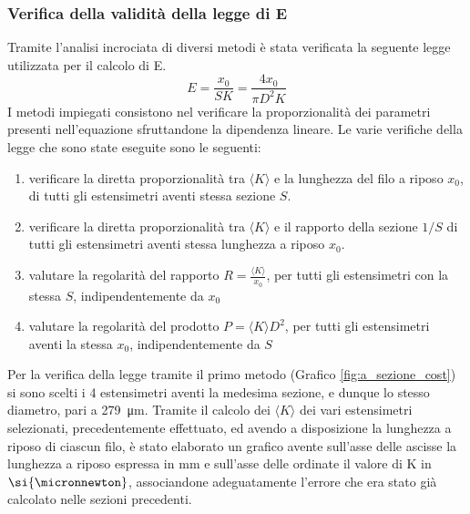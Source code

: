 \documentclass[a4paper,11pt,oneside]{article}
\begin{document}
\subsubsection*{Verifica della validità della legge di E}
Tramite l'analisi incrociata di diversi metodi è stata verificata la seguente legge utilizzata per il calcolo di E.
\begin{equation}
    \label{equation:legge_e}
    E=\frac{x_0}{S K}=\frac{4 x_0}{\pi D^{2}K}
\end{equation}
I metodi impiegati consistono nel verificare la proporzionalità dei parametri presenti nell'equazione sfruttandone la dipendenza lineare. Le varie verifiche della legge che sono state eseguite sono le seguenti:
\begin{enumerate}
    \item verificare la diretta proporzionalità tra $\langle K \rangle$ e la lunghezza del filo a riposo $x_0$, di tutti gli estensimetri aventi stessa sezione $S$.
    \item verificare la diretta proporzionalità tra $\langle K \rangle$ e il rapporto della sezione $1/S$ di tutti gli estensimetri aventi stessa lunghezza a riposo $x_{0}$.
    \item valutare la regolarità del rapporto $R=\frac{\langle K \rangle}{x_{0}}$, per tutti gli estensimetri con la stessa $S$, indipendentemente da $x_{0}$
    \item valutare la regolarità del prodotto $P={ \langle K \rangle} D^2 $, per tutti gli estensimetri aventi la stessa $x_{0}$, indipendentemente da $S$
\end{enumerate}

Per la verifica della legge tramite il primo metodo (Grafico \ref{fig:a_sezione_cost}) si sono scelti i 4  estensimetri aventi la medesima sezione, e dunque lo stesso diametro, pari a \SI{279}{\micro\meter}. Tramite il calcolo dei $\langle K \rangle$ dei vari estensimetri selezionati, precedentemente effettuato, ed avendo a disposizione la lunghezza a riposo di ciascun filo, è stato elaborato un grafico avente sull'asse delle ascisse la lunghezza a riposo espressa in $\si{\milli\meter}$ e sull'asse delle ordinate il valore di K in $\si{\micronnewton}$, associandone adeguatamente l'errore che era stato già calcolato nelle sezioni precedenti.
\end{document}
